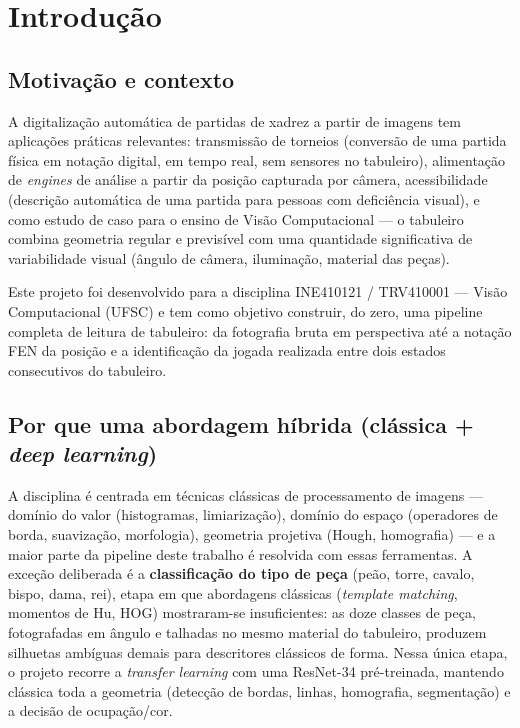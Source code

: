 \section{Introdução}

\subsection{Motivação e contexto}

A digitalização automática de partidas de xadrez a partir de imagens tem aplicações
práticas relevantes: transmissão de torneios (conversão de uma partida física em
notação digital, em tempo real, sem sensores no tabuleiro), alimentação de
\textit{engines} de análise a partir da posição capturada por câmera, acessibilidade
(descrição automática de uma partida para pessoas com deficiência visual), e como
estudo de caso para o ensino de Visão Computacional --- o tabuleiro combina geometria
regular e previsível com uma quantidade significativa de variabilidade visual (ângulo de
câmera, iluminação, material das peças).

Este projeto foi desenvolvido para a disciplina INE410121 / TRV410001 --- Visão
Computacional (UFSC) e tem como objetivo construir, do zero, uma pipeline completa de
leitura de tabuleiro: da fotografia bruta em perspectiva até a notação FEN da posição e
a identificação da jogada realizada entre dois estados consecutivos do tabuleiro.

\subsection{Por que uma abordagem híbrida (clássica + \textit{deep learning})}

A disciplina é centrada em técnicas clássicas de processamento de imagens --- domínio do
valor (histogramas, limiarização), domínio do espaço (operadores de borda, suavização,
morfologia), geometria projetiva (Hough, homografia) --- e a maior parte da pipeline
deste trabalho é resolvida com essas ferramentas. A exceção deliberada é a
\textbf{classificação do tipo de peça} (peão, torre, cavalo, bispo, dama, rei), etapa em
que abordagens clássicas (\textit{template matching}, momentos de Hu, HOG) mostraram-se
insuficientes: as doze classes de peça, fotografadas em ângulo e talhadas no mesmo
material do tabuleiro, produzem silhuetas ambíguas demais para descritores clássicos de
forma. Nessa única etapa, o projeto recorre a \textit{transfer learning} com uma
ResNet-34 pré-treinada, mantendo clássica toda a geometria (detecção de bordas, linhas,
homografia, segmentação) e a decisão de ocupação/cor.

